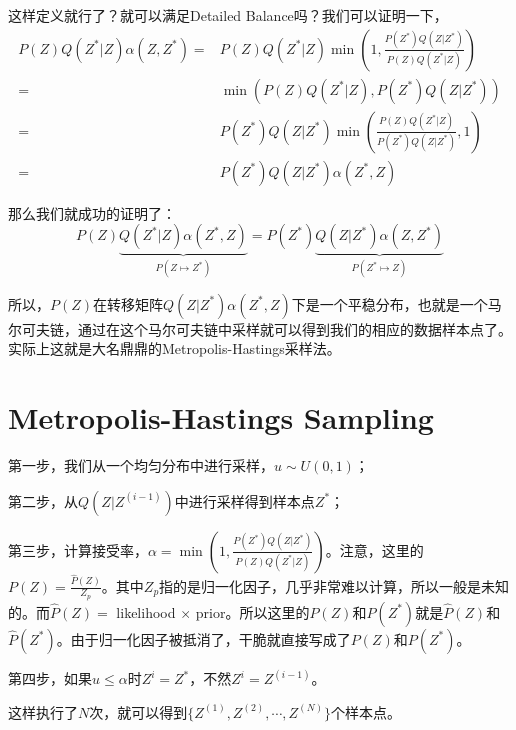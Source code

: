 \documentclass[a4paper]{article}
\begin{document}
这样定义就行了？就可以满足Detailed Balance吗？我们可以证明一下，
\begin{equation}
    \begin{split}
        P(Z)Q(Z^\ast|Z)\alpha(Z,Z^\ast) 
        = & P(Z)Q(Z^\ast|Z)\min \left( 1, \frac{P(Z^\ast)Q(Z|Z^\ast)}{P(Z)Q(Z^\ast|Z)}  \right) \\
        = & \min (P(Z)Q(Z^\ast|Z), P(Z^\ast)Q(Z|Z^\ast)) \\
        = & P(Z^\ast)Q(Z|Z^\ast) \min \left( \frac{P(Z)Q(Z^\ast|Z)}{P(Z^\ast)Q(Z|Z^\ast)}, 1 \right) \\
        = & P(Z^\ast)Q(Z|Z^\ast)\alpha(Z^\ast,Z) 
    \end{split}
\end{equation}

那么我们就成功的证明了：
\begin{equation}
    P(Z)\underbrace{Q(Z^\ast|Z)\alpha(Z^\ast,Z)}_{P(Z\mapsto Z^\ast)}  = P(Z^\ast)\underbrace{Q(Z|Z^\ast)\alpha(Z,Z^\ast)}_{P(Z^\ast\mapsto Z)}
\end{equation}

所以，$P(Z)$在转移矩阵$Q(Z|Z^\ast)\alpha(Z^\ast,Z)$下是一个平稳分布，也就是一个马尔可夫链，通过在这个马尔可夫链中采样就可以得到我们的相应的数据样本点了。实际上这就是大名鼎鼎的Metropolis-Hastings采样法。

\section{Metropolis-Hastings Sampling}
第一步，我们从一个均匀分布中进行采样，$u\sim U(0,1)$；

第二步，从$Q(Z|Z^{(i-1)})$中进行采样得到样本点$Z^\ast$；

第三步，计算接受率，$\alpha = \min \left( 1, \frac{P(Z^\ast)Q(Z|Z^\ast)}{P(Z)Q(Z^\ast|Z)}  \right)$。注意，这里的$P(Z) = \frac{\hat{P}(Z)}{Z_p}$。其中$Z_p$指的是归一化因子，几乎非常难以计算，所以一般是未知的。而$\hat{P}(Z) = $ likelihood $\times$ prior。所以这里的$P(Z)$和$P(Z^\ast)$就是$\hat{P}(Z)$和$\hat{P}(Z^\ast)$。由于归一化因子被抵消了，干脆就直接写成了$P(Z)$和$P(Z^\ast)$。

第四步，如果$u \leq \alpha$时$Z^{i} = Z^\ast$，不然$Z^{i} = Z^{(i-1)}$。

这样执行了$N$次，就可以得到$\{ Z^{(1)},Z^{(2)},\cdots,Z^{(N)} \}$个样本点。
\end{document}
